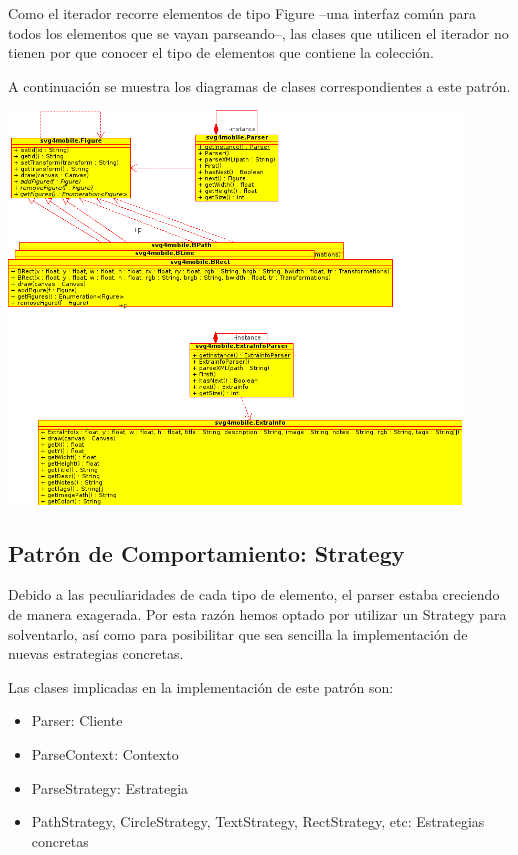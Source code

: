 \documentclass[a4paper,10pt]{article}
\begin{document}
Como el iterador recorre elementos de tipo Figure --una interfaz común para todos los elementos que se vayan parseando--, las clases que utilicen el iterador no tienen por que conocer el tipo de elementos que contiene la colección.

A continuación se muestra los diagramas de clases correspondientes a este patrón.

\begin{center}
 \includegraphics[width=12cm]{texres/iterator.png}
\end{center}

\subsection{Patrón de Comportamiento: Strategy}
Debido a las peculiaridades de cada tipo de elemento, el parser estaba creciendo de manera exagerada. Por esta razón hemos optado por utilizar un Strategy para solventarlo, así como para posibilitar que sea sencilla la implementación de nuevas estrategias concretas. 

Las clases implicadas en la implementación de este patrón son:

\begin{itemize}
\item Parser: Cliente
\item ParseContext: Contexto
\item ParseStrategy: Estrategia
\item PathStrategy, CircleStrategy, TextStrategy, RectStrategy, etc: Estrategias concretas
\end{itemize}
\end{document}
